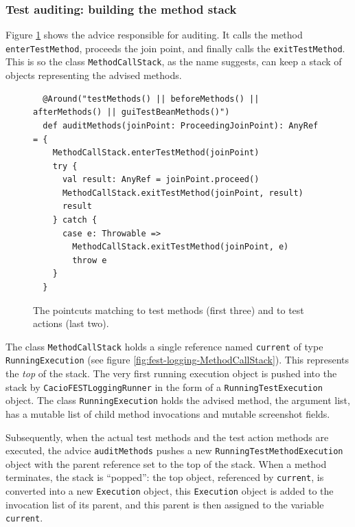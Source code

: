 \subsubsection{Test auditing: building the method stack}

Figure \ref{fig:fest-logging-auditMethods} shows the advice responsible for auditing. It calls the method \texttt{enterTestMethod}, proceeds the join point, and finally calls the \texttt{exitTestMethod}. This is so the class \texttt{MethodCallStack}, as the name suggests, can keep a stack of objects representing the advised methods.

\begin{figure}[h!]
\centering
\begin{lstlisting}
  @Around("testMethods() || beforeMethods() || afterMethods() || guiTestBeanMethods()")
  def auditMethods(joinPoint: ProceedingJoinPoint): AnyRef = {
    MethodCallStack.enterTestMethod(joinPoint)
    try {
      val result: AnyRef = joinPoint.proceed()
      MethodCallStack.exitTestMethod(joinPoint, result)
      result
    } catch {
      case e: Throwable =>
        MethodCallStack.exitTestMethod(joinPoint, e)
        throw e
    }
  }
\end{lstlisting}
\caption{The pointcuts matching to test methods (first three) and to test actions (last two).}
\label{fig:fest-logging-auditMethods}
\end{figure}

The class \texttt{MethodCallStack} holds a single reference named \texttt{current} of type \texttt{RunningExecution} (see figure \ref{fig:fest-logging-MethodCallStack}). This represents the \emph{top} of the stack. The very first running execution object is pushed into the stack by \texttt{CacioFESTLoggingRunner} in the form of a \texttt{RunningTestExecution} object. The class \texttt{RunningExecution} holds the advised method, the argument list, has a mutable list of child method invocations and mutable screenshot fields. 

Subsequently, when the actual test methods and the test action methods are executed, the advice \texttt{auditMethods} pushes a new \texttt{RunningTestMethodExecution} object with the parent reference set to the top of the stack. When a method terminates, the stack is ``popped'': the top object, referenced by \texttt{current}, is converted into a new \texttt{Execution} object, this \texttt{Execution} object is added to the invocation list of its parent, and this parent is then assigned to the variable \texttt{current}.


